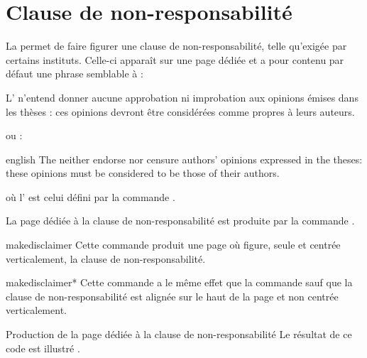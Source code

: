 \section{Clause de non-responsabilité}
\label{sec-clause-de-non}%
%

%
%
La \yatCl{} permet de faire figurer une clause de non-responsabilité, telle
qu'exigée par certains instituts. Celle-ci apparaît sur une page dédiée et
a pour contenu par défaut une phrase semblable à\selonlangue{} :
\begin{displayquote}
  L' n'entend donner aucune approbation ni improbation aux
  opinions \'emises dans les th\`eses : ces opinions devront \^etre
  consid\'er\'ees comme propres \`a leurs auteurs.
\end{displayquote}
ou :
\begin{foreigndisplayquote}{english}
  The  neither endorse nor censure authors' opinions expressed in
  the theses: these opinions must be considered to be those of their authors.
\end{foreigndisplayquote}
où l' est celui défini par la commande 
.

La page dédiée à la clause de non-responsabilité est produite par la commande
.

\begin{docCommand}{makedisclaimer}{}
  Cette commande produit une page où figure, seule et centrée
  verticalement, la clause de non-responsabilité.
\end{docCommand}

\begin{docCommand}{makedisclaimer*}{}
  Cette commande a le même effet que la commande
   sauf que la clause de non-responsabilité est alignée
  sur le haut de la page et non centrée verticalement.
\end{docCommand}

\begin{dbexample}{Production de la page dédiée à la clause de
    non-responsabilité}{}
  \NoAutoSpacing%
  Le résultat de ce code est illustré .
\end{dbexample}

